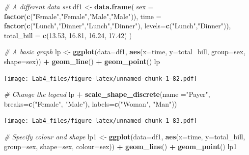 \documentclass[]{article}
\newenvironment{Shaded}{\begin{snugshade}}{\end{snugshade}}
\newcommand{\KeywordTok}[1]{\textcolor[rgb]{0.13,0.29,0.53}{\textbf{#1}}}
\newcommand{\DataTypeTok}[1]{\textcolor[rgb]{0.13,0.29,0.53}{#1}}
\newcommand{\FloatTok}[1]{\textcolor[rgb]{0.00,0.00,0.81}{#1}}
\newcommand{\StringTok}[1]{\textcolor[rgb]{0.31,0.60,0.02}{#1}}
\newcommand{\CommentTok}[1]{\textcolor[rgb]{0.56,0.35,0.01}{\textit{#1}}}
\newcommand{\OperatorTok}[1]{\textcolor[rgb]{0.81,0.36,0.00}{\textbf{#1}}}
\newcommand{\NormalTok}[1]{#1}
\begin{document}
\begin{Shaded}
\begin{Highlighting}[]
\CommentTok{# A different data set}
\NormalTok{df1 <-}\StringTok{ }\KeywordTok{data.frame}\NormalTok{(}
    \DataTypeTok{sex =} \KeywordTok{factor}\NormalTok{(}\KeywordTok{c}\NormalTok{(}\StringTok{"Female"}\NormalTok{,}\StringTok{"Female"}\NormalTok{,}\StringTok{"Male"}\NormalTok{,}\StringTok{"Male"}\NormalTok{)),}
    \DataTypeTok{time =} \KeywordTok{factor}\NormalTok{(}\KeywordTok{c}\NormalTok{(}\StringTok{"Lunch"}\NormalTok{,}\StringTok{"Dinner"}\NormalTok{,}\StringTok{"Lunch"}\NormalTok{,}\StringTok{"Dinner"}\NormalTok{), }\DataTypeTok{levels=}\KeywordTok{c}\NormalTok{(}\StringTok{"Lunch"}\NormalTok{,}\StringTok{"Dinner"}\NormalTok{)),}
    \DataTypeTok{total_bill =} \KeywordTok{c}\NormalTok{(}\FloatTok{13.53}\NormalTok{, }\FloatTok{16.81}\NormalTok{, }\FloatTok{16.24}\NormalTok{, }\FloatTok{17.42}\NormalTok{)}
\NormalTok{)}

\CommentTok{# A basic graph}
\NormalTok{lp <-}\StringTok{ }\KeywordTok{ggplot}\NormalTok{(}\DataTypeTok{data=}\NormalTok{df1, }\KeywordTok{aes}\NormalTok{(}\DataTypeTok{x=}\NormalTok{time, }\DataTypeTok{y=}\NormalTok{total_bill, }\DataTypeTok{group=}\NormalTok{sex, }\DataTypeTok{shape=}\NormalTok{sex)) }\OperatorTok{+}\StringTok{ }\KeywordTok{geom_line}\NormalTok{() }\OperatorTok{+}\StringTok{ }\KeywordTok{geom_point}\NormalTok{()}
\NormalTok{lp}
\end{Highlighting}
\end{Shaded}

\texttt{[image: Lab4\_files/figure-latex/unnamed-chunk-1-82.pdf]}

\begin{Shaded}
\begin{Highlighting}[]
\CommentTok{# Change the legend}
\NormalTok{lp }\OperatorTok{+}\StringTok{ }\KeywordTok{scale_shape_discrete}\NormalTok{(}\DataTypeTok{name  =}\StringTok{"Payer"}\NormalTok{,}
                          \DataTypeTok{breaks=}\KeywordTok{c}\NormalTok{(}\StringTok{"Female"}\NormalTok{, }\StringTok{"Male"}\NormalTok{),}
                          \DataTypeTok{labels=}\KeywordTok{c}\NormalTok{(}\StringTok{"Woman"}\NormalTok{, }\StringTok{"Man"}\NormalTok{))}
\end{Highlighting}
\end{Shaded}

\texttt{[image: Lab4\_files/figure-latex/unnamed-chunk-1-83.pdf]}

\begin{Shaded}
\begin{Highlighting}[]
\CommentTok{# Specify colour and shape}
\NormalTok{lp1 <-}\StringTok{ }\KeywordTok{ggplot}\NormalTok{(}\DataTypeTok{data=}\NormalTok{df1, }\KeywordTok{aes}\NormalTok{(}\DataTypeTok{x=}\NormalTok{time, }\DataTypeTok{y=}\NormalTok{total_bill, }\DataTypeTok{group=}\NormalTok{sex, }\DataTypeTok{shape=}\NormalTok{sex, }\DataTypeTok{colour=}\NormalTok{sex)) }\OperatorTok{+}\StringTok{ }\KeywordTok{geom_line}\NormalTok{() }\OperatorTok{+}\StringTok{ }\KeywordTok{geom_point}\NormalTok{()}
\NormalTok{lp1}
\end{Highlighting}
\end{Shaded}
\end{document}
